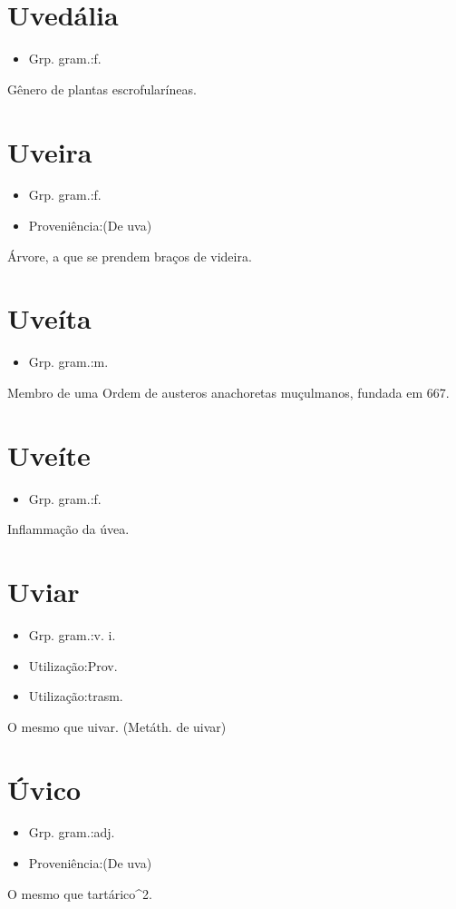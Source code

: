 \documentclass{article}
\begin{document}
\section{Uvedália}
\begin{itemize}
\item {Grp. gram.:f.}
\end{itemize}
Gênero de plantas escrofularíneas.
\section{Uveira}
\begin{itemize}
\item {Grp. gram.:f.}
\end{itemize}
\begin{itemize}
\item {Proveniência:(De \textunderscore uva\textunderscore )}
\end{itemize}
Árvore, a que se prendem braços de videira.
\section{Uveíta}
\begin{itemize}
\item {Grp. gram.:m.}
\end{itemize}
Membro de uma Ordem de austeros anachoretas muçulmanos, fundada em 667.
\section{Uveíte}
\begin{itemize}
\item {Grp. gram.:f.}
\end{itemize}
Inflammação da úvea.
\section{Uviar}
\begin{itemize}
\item {Grp. gram.:v. i.}
\end{itemize}
\begin{itemize}
\item {Utilização:Prov.}
\end{itemize}
\begin{itemize}
\item {Utilização:trasm.}
\end{itemize}
O mesmo que \textunderscore uivar\textunderscore .
(Metáth. de \textunderscore uivar\textunderscore )
\section{Úvico}
\begin{itemize}
\item {Grp. gram.:adj.}
\end{itemize}
\begin{itemize}
\item {Proveniência:(De \textunderscore uva\textunderscore )}
\end{itemize}
O mesmo que \textunderscore tartárico\textunderscore ^2.
\end{document}
